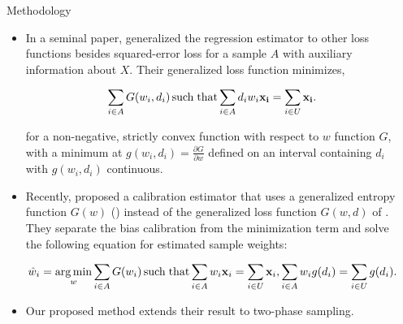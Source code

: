\documentclass[final]{beamer}
\DeclareMathOperator*{\argmin}{arg\,min}
\DeclareMathOperator*{\suchthat}{such\; that}
\newlength{\sepwidth}
\newlength{\colwidth}
\newcommand{\separatorcolumn}{\begin{column}{\sepwidth}\end{column}}
\begin{document}
\begin{frame}[t]
\begin{columns}[t]
\separatorcolumn

\begin{column}{\colwidth}

  \begin{block}{Methodology}


    \vspace{-0.3cm}
    \begin{itemize}
      \item In a seminal paper, \cite{deville1992calibration} generalized the
        regression estimator to other loss functions besides squared-error loss
        for a sample $A$ with auxiliary information about $X$. Their generalized
        loss function minimizes,

        $$
        \sum_{i \in A} G(w_{i}, d_{i}) \suchthat \sum_{i \in
        A} d_{i} w_{i} {\bf x_i} = \sum_{i \in U} {\bf x_i}.
        $$

        for a non-negative, strictly convex function with respect to $w$
        function $G$, with a minimum at $g(w_i, d_i) = \frac{\partial G}{\partial
        w}$ defined on an interval containing $d_{i}$ with $g(w_i, d_i)$
        continuous.
    \end{itemize}


    \vspace{-0.3cm}
    \begin{itemize}
      \item Recently, \cite{kwon2024debiased} proposed a calibration estimator that
        uses a generalized entropy function $G(w)$ (\cite{gneiting2007strictly})
        instead of the generalized loss function $G(w, d)$ of
        \cite{deville1992calibration}. They separate the bias calibration from
        the minimization term and solve the following equation for estimated
        sample weights:

        $$
        \hat w_{i} = \argmin_{w} \sum_{i \in A} G(w_i)
        \suchthat \sum_{i \in A} w_{i} {\bf{x}}_i = 
        \sum_{i \in U} {\bf{x}}_i,
        \sum_{i \in A} w_i g(d_i) = \sum_{i \in U} g(d_i) .
        $$

      \item Our proposed method extends their result to two-phase sampling.
    \end{itemize}

  \end{block}


\end{column}
\end{columns}
\end{frame}
\end{document}
